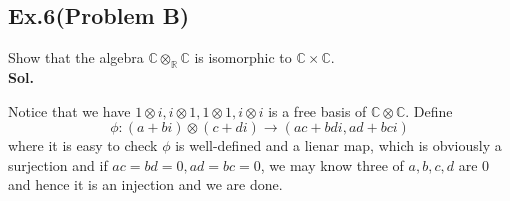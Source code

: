 \documentclass[lang=en,11pt,a4paper,citestyle =authoryear]{elegantpaper}
\begin{document}
\subsection*{Ex.6(Problem B)} 
Show that the algebra $\mathbb{C}\otimes_{\mathbb{R}}\mathbb{C}$ is isomorphic to $\mathbb{C}\times\mathbb{C}$.
\vspace{0.5em}\\
\textbf{Sol.} \par
Notice that we have $1\otimes i, i\otimes 1, 1\otimes 1, i\otimes i$ is a free basis of $\mathbb{C}\otimes \mathbb{C}$. Define
\[
\phi: (a+bi)\otimes(c+di) \to (ac + bdi, ad+bci)
\]
where it is easy to check $\phi$ is well-defined and a lienar map, which is obviously a surjection and if $ac = bd = 0, ad = bc = 0$, we may know three of $a,b,c,d$ are $0$ and hence it is an injection and we are done.
\par 
\vspace{0.5em}

\addappheadtotoc
\end{document}
